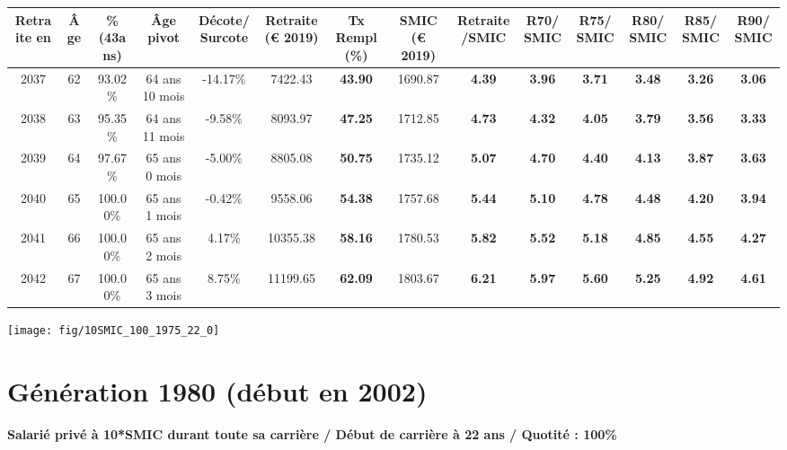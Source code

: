 \begin{adjustbox}{max width=\textwidth} 
\begin{tabular}[htb]{|c|c||c|c|c||c|c||c|c||c|c|c|c|c|} 
\hline 
 Retraite en &  Âge &  \%(43ans) &  Âge pivot &  Décote/Surcote &  Retraite (\euro{} 2019) &  Tx Rempl(\%) &  SMIC (\euro{} 2019) &  Retraite/SMIC &  R70/SMIC &  R75/SMIC &  R80/SMIC &  R85/SMIC &  R90/SMIC \\ 
\hline \hline 
 2037 &  62 &  93.02\% &  64 ans 10 mois &  -14.17\% &  7422.43 &  {\bf 43.90} &  1690.87 &  {\bf 4.39} &  {\bf 3.96} &  {\bf 3.71} &  {\bf 3.48} &  {\bf 3.26} &  {\bf 3.06} \\ 
\hline 
 2038 &  63 &  95.35\% &  64 ans 11 mois &  -9.58\% &  8093.97 &  {\bf 47.25} &  1712.85 &  {\bf 4.73} &  {\bf 4.32} &  {\bf 4.05} &  {\bf 3.79} &  {\bf 3.56} &  {\bf 3.33} \\ 
\hline 
 2039 &  64 &  97.67\% &  65 ans 0 mois &  -5.00\% &  8805.08 &  {\bf 50.75} &  1735.12 &  {\bf 5.07} &  {\bf 4.70} &  {\bf 4.40} &  {\bf 4.13} &  {\bf 3.87} &  {\bf 3.63} \\ 
\hline 
 2040 &  65 &  100.00\% &  65 ans 1 mois &  -0.42\% &  9558.06 &  {\bf 54.38} &  1757.68 &  {\bf 5.44} &  {\bf 5.10} &  {\bf 4.78} &  {\bf 4.48} &  {\bf 4.20} &  {\bf 3.94} \\ 
\hline 
 2041 &  66 &  100.00\% &  65 ans 2 mois &  4.17\% &  10355.38 &  {\bf 58.16} &  1780.53 &  {\bf 5.82} &  {\bf 5.52} &  {\bf 5.18} &  {\bf 4.85} &  {\bf 4.55} &  {\bf 4.27} \\ 
\hline 
 2042 &  67 &  100.00\% &  65 ans 3 mois &  8.75\% &  11199.65 &  {\bf 62.09} &  1803.67 &  {\bf 6.21} &  {\bf 5.97} &  {\bf 5.60} &  {\bf 5.25} &  {\bf 4.92} &  {\bf 4.61} \\ 
\hline 
\hline 
\end{tabular} 
\end{adjustbox} 
 
 \vspace{0.1cm} 

 {\hspace{-2.2cm}\texttt{[image: fig/10SMIC\_100\_1975\_22\_0]}} 

\newpage 
 
\section{Génération 1980 (début en 2002)\label{10SMIC_100_1980_22_0}} 
 
{\bf \noindent Salarié privé à 10*SMIC durant toute sa carrière / Début de carrière à 22 ans / Quotité : 100\%}  ~ 


